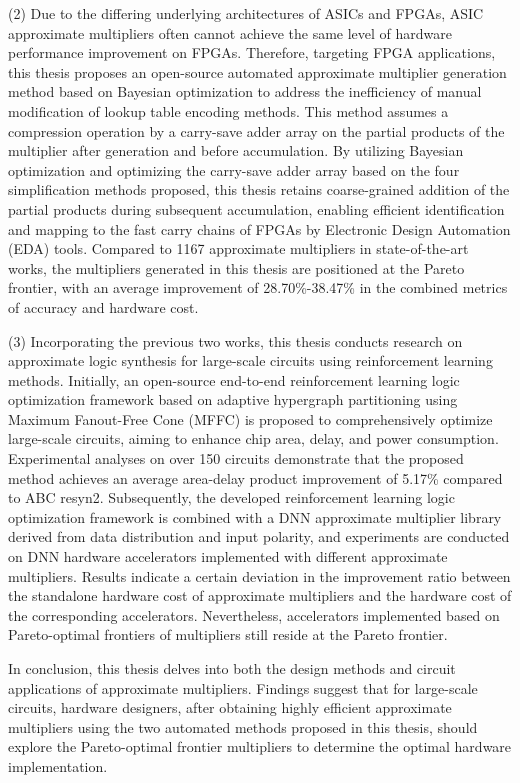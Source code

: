 \begin{abstract*}
    (2) Due to the differing underlying architectures of ASICs and FPGAs, ASIC approximate multipliers often cannot achieve the same level of hardware performance improvement on FPGAs. Therefore, targeting FPGA applications, this thesis proposes an open-source automated approximate multiplier generation method based on Bayesian optimization to address the inefficiency of manual modification of lookup table encoding methods. This method assumes a compression operation by a carry-save adder array on the partial products of the multiplier after generation and before accumulation. By utilizing Bayesian optimization and optimizing the carry-save adder array based on the four simplification methods proposed, this thesis retains coarse-grained addition of the partial products during subsequent accumulation, enabling efficient identification and mapping to the fast carry chains of FPGAs by Electronic Design Automation (EDA) tools. Compared to 1167 approximate multipliers in state-of-the-art works, the multipliers generated in this thesis are positioned at the Pareto frontier, with an average improvement of 28.70\%-38.47\% in the combined metrics of accuracy and hardware cost.

    (3) Incorporating the previous two works, this thesis conducts research on approximate logic synthesis for large-scale circuits using reinforcement learning methods. Initially, an open-source end-to-end reinforcement learning logic optimization framework based on adaptive hypergraph partitioning using Maximum Fanout-Free Cone (MFFC) is proposed to comprehensively optimize large-scale circuits, aiming to enhance chip area, delay, and power consumption. Experimental analyses on over 150 circuits demonstrate that the proposed method achieves an average area-delay product improvement of 5.17\% compared to ABC resyn2. Subsequently, the developed reinforcement learning logic optimization framework is combined with a DNN approximate multiplier library derived from data distribution and input polarity, and experiments are conducted on DNN hardware accelerators implemented with different approximate multipliers. Results indicate a certain deviation in the improvement ratio between the standalone hardware cost of approximate multipliers and the hardware cost of the corresponding accelerators. Nevertheless, accelerators implemented based on Pareto-optimal frontiers of multipliers still reside at the Pareto frontier.

    In conclusion, this thesis delves into both the design methods and circuit applications of approximate multipliers. Findings suggest that for large-scale circuits, hardware designers, after obtaining highly efficient approximate multipliers using the two automated methods proposed in this thesis, should explore the Pareto-optimal frontier multipliers to determine the optimal hardware implementation.
    
\end{abstract*}